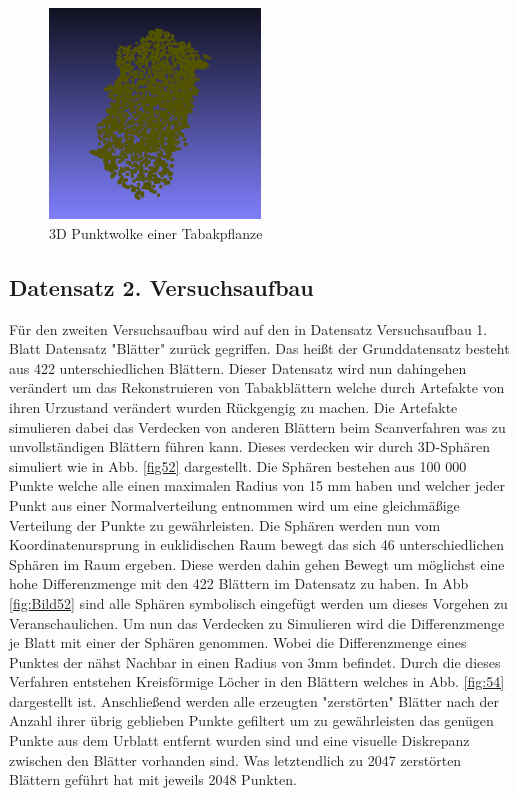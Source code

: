 \documentclass{llncs}
\begin{document}
\begin{figure}[htbp] 
	\centering
	\includegraphics[width=0.5\textwidth]{leaf1.png}
	\caption{3D Punktwolke einer Tabakpflanze}
	\label{fig:Bild51}
\end{figure}
\newpage
\subsection{Datensatz 2. Versuchsaufbau}\label{sec:versuch2_daten}

Für den zweiten Versuchsaufbau wird auf den in Datensatz Versuchsaufbau 1. Blatt Datensatz "Blätter" zurück gegriffen. Das heißt der Grunddatensatz besteht aus 422 unterschiedlichen Blättern. Dieser Datensatz wird nun dahingehen verändert um das Rekonstruieren von Tabakblättern welche durch Artefakte von ihren Urzustand verändert wurden Rückgengig zu machen. Die Artefakte simulieren dabei das Verdecken von anderen Blättern beim Scanverfahren was zu unvollständigen Blättern führen kann. Dieses verdecken wir durch 3D-Sphären simuliert wie in Abb. \ref{fig52} dargestellt. Die Sphären bestehen aus 100 000 Punkte welche alle einen maximalen Radius von 15 mm haben und welcher jeder Punkt aus einer Normalverteilung entnommen wird um  eine gleichmäßige Verteilung der Punkte zu gewährleisten. Die Sphären werden nun vom Koordinatenursprung in euklidischen Raum bewegt das sich 46 unterschiedlichen Sphären im Raum ergeben. Diese werden dahin gehen Bewegt um möglichst eine hohe Differenzmenge mit den 422 Blättern im Datensatz zu haben. In Abb  \ref{fig:Bild52} sind alle Sphären symbolisch eingefügt werden um dieses Vorgehen zu Veranschaulichen. Um nun das Verdecken zu Simulieren wird die Differenzmenge je Blatt mit einer der Sphären genommen. Wobei die Differenzmenge eines Punktes der nähst Nachbar in einen Radius von 3mm befindet. Durch die dieses Verfahren entstehen Kreisförmige Löcher in den Blättern welches in Abb. \ref{fig:54} dargestellt ist. Anschließend werden alle erzeugten "zerstörten" Blätter nach der Anzahl ihrer übrig geblieben Punkte gefiltert um zu gewährleisten das genügen Punkte aus dem Urblatt entfernt wurden sind und eine visuelle Diskrepanz zwischen den Blätter vorhanden sind. Was letztendlich zu 2047 zerstörten Blättern geführt hat mit jeweils 2048 Punkten.
\end{document}
